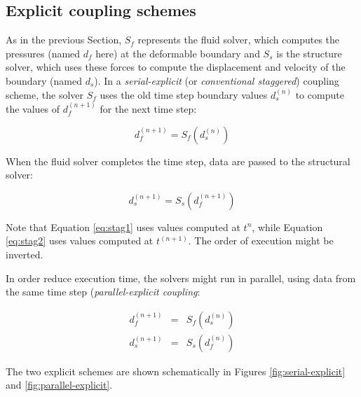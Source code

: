 \subsection{Explicit coupling schemes}
\label{subsec:explicit}

As in the previous Section, $S_f$ represents the fluid solver, which computes the pressures (named $d_f$ here) at the deformable boundary and $S_s$ is the structure solver, which uses these forces to compute the displacement and velocity of the boundary (named $d_s$). In a \textit{serial-explicit} (or \textit{conventional staggered}) coupling scheme, the solver $S_f$ uses the old time step boundary values $d_s^{(n)}$ to compute the values of $d_f^{(n+1)}$ for the next time step:

\begin{equation}
	d_f^{(n+1)} = S_f\left(d_s^{(n)}\right)
	\label{eq:stag1}
\end{equation}

When the fluid solver completes the time step, data are passed to the structural solver:

\begin{equation}
	d_s^{(n+1)} = S_s\left( d_f^{(n+1)} \right)
	\label{eq:stag2}
\end{equation}

Note that Equation \ref{eq:stag1} uses values computed at $t^n$, while Equation \ref{eq:stag2} uses values computed at $t^{(n+1)}$. The order of execution might be inverted.

In order reduce execution time, the solvers might run in parallel, using data from the same time step (\textit{parallel-explicit coupling}:

\begin{subequations}
\begin{eqnarray}
	d_f^{(n+1)} &=& S_f\left(d_s^{(n)}\right) \\
	d_s^{(n+1)} &=& S_s\left( d_f^{(n)} \right)
	\label{eq:par-exp}
\end{eqnarray} 
\end{subequations}


The two explicit schemes are shown schematically in Figures \ref{fig:serial-explicit} and \ref{fig:parallel-explicit}.

